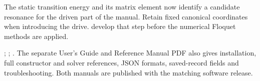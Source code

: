 The static transition energy and its matrix element now identify a candidate
resonance for the driven part of the manual. Retain fixed canonical coordinates
when introducing the drive.  develop that step before
the numerical Floquet methods are applied.

\begin{incode}
;
;
. The separate User's Guide and Reference Manual PDF
also gives installation, full constructor and solver references, JSON formats,
saved-record fields and troubleshooting. Both manuals are published with the
matching software release.
\end{incode}

